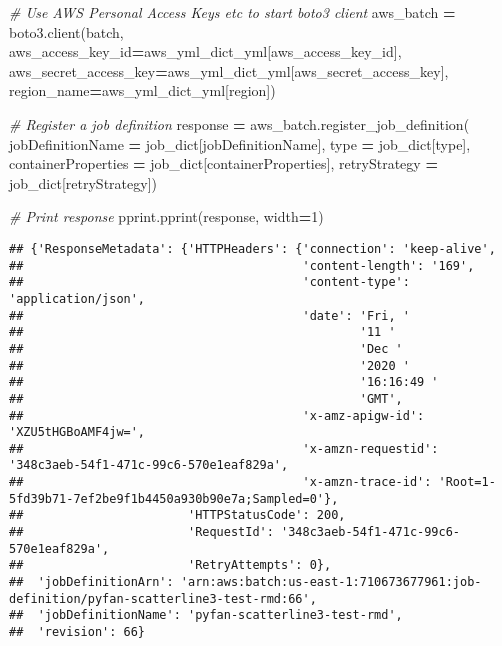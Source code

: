 \documentclass[
]{book}
\newenvironment{Shaded}{\begin{snugshade}}{\end{snugshade}}
\newcommand{\BuiltInTok}[1]{#1}
\newcommand{\CommentTok}[1]{\textcolor[rgb]{0.56,0.35,0.01}{\textit{#1}}}
\newcommand{\DecValTok}[1]{\textcolor[rgb]{0.00,0.00,0.81}{#1}}
\newcommand{\NormalTok}[1]{#1}
\newcommand{\OperatorTok}[1]{\textcolor[rgb]{0.81,0.36,0.00}{\textbf{#1}}}
\newcommand{\StringTok}[1]{\textcolor[rgb]{0.31,0.60,0.02}{#1}}
\begin{document}
\begin{Shaded}
\begin{Highlighting}[]
\CommentTok{\# Use AWS Personal Access Keys etc to start boto3 client}
\NormalTok{aws\_batch }\OperatorTok{=}\NormalTok{ boto3.client(}\StringTok{\textquotesingle{}batch\textquotesingle{}}\NormalTok{,}
\NormalTok{  aws\_access\_key\_id}\OperatorTok{=}\NormalTok{aws\_yml\_dict\_yml[}\StringTok{\textquotesingle{}aws\_access\_key\_id\textquotesingle{}}\NormalTok{],}
\NormalTok{  aws\_secret\_access\_key}\OperatorTok{=}\NormalTok{aws\_yml\_dict\_yml[}\StringTok{\textquotesingle{}aws\_secret\_access\_key\textquotesingle{}}\NormalTok{],}
\NormalTok{  region\_name}\OperatorTok{=}\NormalTok{aws\_yml\_dict\_yml[}\StringTok{\textquotesingle{}region\textquotesingle{}}\NormalTok{])}

\CommentTok{\# Register a job definition}
\NormalTok{response }\OperatorTok{=}\NormalTok{ aws\_batch.register\_job\_definition(}
\NormalTok{        jobDefinitionName }\OperatorTok{=}\NormalTok{ job\_dict[}\StringTok{\textquotesingle{}jobDefinitionName\textquotesingle{}}\NormalTok{],}
        \BuiltInTok{type} \OperatorTok{=}\NormalTok{ job\_dict[}\StringTok{\textquotesingle{}type\textquotesingle{}}\NormalTok{],}
\NormalTok{        containerProperties }\OperatorTok{=}\NormalTok{ job\_dict[}\StringTok{\textquotesingle{}containerProperties\textquotesingle{}}\NormalTok{],}
\NormalTok{        retryStrategy }\OperatorTok{=}\NormalTok{ job\_dict[}\StringTok{\textquotesingle{}retryStrategy\textquotesingle{}}\NormalTok{])}

\CommentTok{\# Print response}
\NormalTok{pprint.pprint(response, width}\OperatorTok{=}\DecValTok{1}\NormalTok{)}
\end{Highlighting}
\end{Shaded}

\begin{verbatim}
## {'ResponseMetadata': {'HTTPHeaders': {'connection': 'keep-alive',
##                                       'content-length': '169',
##                                       'content-type': 'application/json',
##                                       'date': 'Fri, '
##                                               '11 '
##                                               'Dec '
##                                               '2020 '
##                                               '16:16:49 '
##                                               'GMT',
##                                       'x-amz-apigw-id': 'XZU5tHGBoAMF4jw=',
##                                       'x-amzn-requestid': '348c3aeb-54f1-471c-99c6-570e1eaf829a',
##                                       'x-amzn-trace-id': 'Root=1-5fd39b71-7ef2be9f1b4450a930b90e7a;Sampled=0'},
##                       'HTTPStatusCode': 200,
##                       'RequestId': '348c3aeb-54f1-471c-99c6-570e1eaf829a',
##                       'RetryAttempts': 0},
##  'jobDefinitionArn': 'arn:aws:batch:us-east-1:710673677961:job-definition/pyfan-scatterline3-test-rmd:66',
##  'jobDefinitionName': 'pyfan-scatterline3-test-rmd',
##  'revision': 66}
\end{verbatim}
\end{document}
